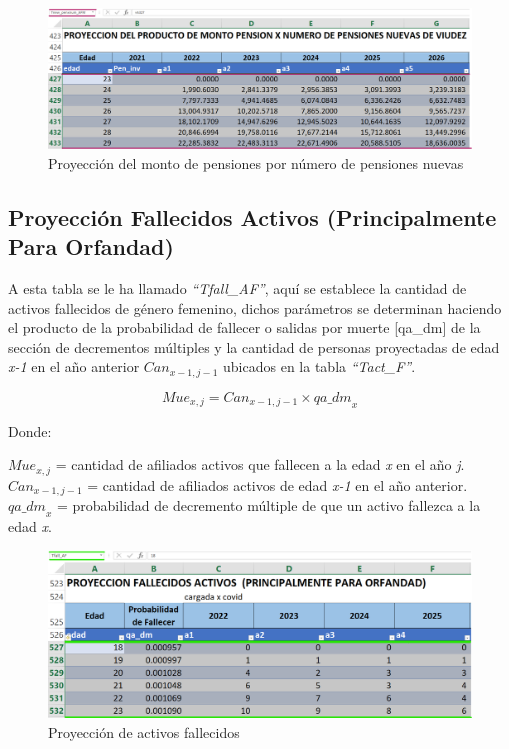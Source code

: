 \documentclass[
  letterpaper,
  DIV=11,
  numbers=noendperiod]{scrreprt}
\begin{document}
\begin{figure}

{\centering \includegraphics{images/F/Img19.png}

}

\caption{Proyección del monto de pensiones por número de pensiones
nuevas}

\end{figure}

\hypertarget{proyecciuxf3n-fallecidos-activos-principalmente-para-orfandad}{%
\subsection{Proyección Fallecidos Activos (Principalmente Para
Orfandad)}\label{proyecciuxf3n-fallecidos-activos-principalmente-para-orfandad}}

A esta tabla se le ha llamado \emph{``Tfall\_AF''}, aquí se establece la
cantidad de activos fallecidos de género femenino, dichos parámetros se
determinan haciendo el producto de la probabilidad de fallecer o salidas
por muerte {[}qa\_dm{]} de la sección de decrementos múltiples y la
cantidad de personas proyectadas de edad \emph{x-1} en el año anterior
\({Can}_{x-1,j-1}\) ubicados en la tabla \emph{``Tact\_F''}.

\begin{equation}
{Mue}_{x,j}={Can}_{x-1,j-1}\times{qa\_dm}_x
\end{equation}

Donde:

\(Mue_{x,j}\) = cantidad de afiliados activos que fallecen a la edad
\emph{x} en el año \emph{j}.\\
\(Can_{x-1,j-1}\) = cantidad de afiliados activos de edad \emph{x-1} en
el año anterior.\\
\({qa\_dm}_x\) = probabilidad de decremento múltiple de que un activo
fallezca a la edad \emph{x}.

\begin{figure}

{\centering \includegraphics{images/F/Img20.png}

}

\caption{Proyección de activos fallecidos}

\end{figure}
\end{document}
